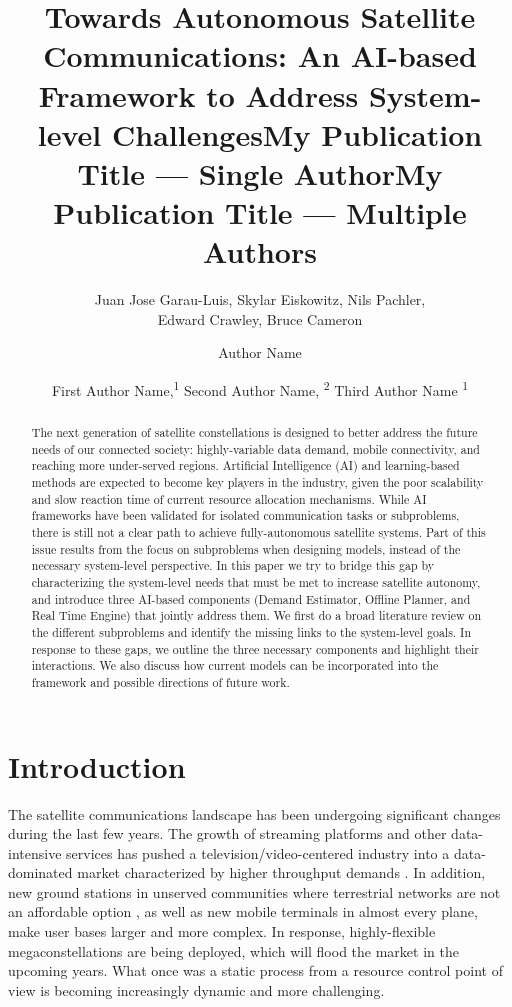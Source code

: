 \documentclass[letterpaper]{article} %
\title{Towards Autonomous Satellite Communications: An AI-based Framework to Address System-level Challenges}
\author{
    Juan Jose Garau-Luis\equalcontrib, Skylar Eiskowitz\equalcontrib, Nils Pachler\equalcontrib,\\
    Edward Crawley, Bruce Cameron
}
\title{My Publication Title --- Single Author}
\author {
    Author Name
}
\title{My Publication Title --- Multiple Authors}
\author {
    First Author Name,\textsuperscript{\rm 1}
    Second Author Name, \textsuperscript{\rm 2}
    Third Author Name \textsuperscript{\rm 1}
}
\begin{document}
\maketitle

\begin{abstract}
The next generation of satellite constellations is designed to better address the future needs of our connected society: highly-variable data demand, mobile connectivity, and reaching more under-served regions. Artificial Intelligence (AI) and learning-based methods are expected to become key players in the industry, given the poor scalability and slow reaction time of current resource allocation mechanisms. While AI frameworks have been validated for isolated communication tasks or subproblems, there is still not a clear path to achieve fully-autonomous satellite systems. Part of this issue results from the focus on subproblems when designing models, instead of the necessary system-level perspective. In this paper we try to bridge this gap by characterizing the system-level needs that must be met to increase satellite autonomy, and introduce three AI-based components (Demand Estimator, Offline Planner, and Real Time Engine) that jointly address them. We first do a broad literature review on the different subproblems and identify the missing links to the system-level goals. In response to these gaps, we outline the three necessary components and highlight their interactions. We also discuss how current models can be incorporated into the framework and possible directions of future work.
\end{abstract}


\section{Introduction}

The satellite communications landscape has been undergoing significant changes during the last few years. The growth of streaming platforms and other data-intensive services has pushed a television/video-centered industry into a data-dominated market characterized by higher throughput demands \cite{NorthernSkyResearch2019}. In addition, new ground stations in unserved communities where terrestrial networks are not an affordable option \cite{Reut}, as well as new mobile terminals in almost every plane, make user bases larger and more complex. In response, highly-flexible megaconstellations are being deployed, which will flood the market in the upcoming years. What once was a static process from a resource control point of view is becoming increasingly dynamic and more challenging.
\end{document}
